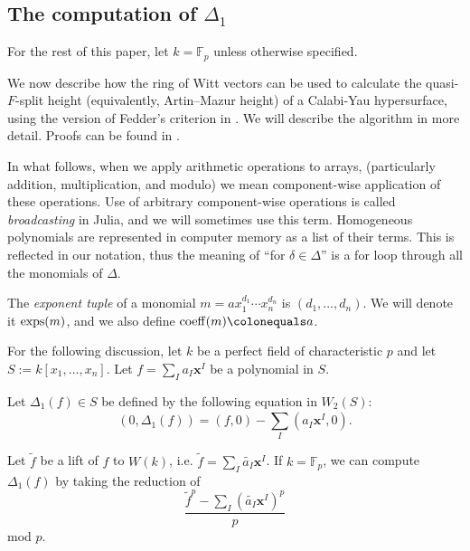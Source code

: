 \subsection{The computation of \(\Delta_{1}\)}
\label{subsec:compute:delta1}

For the rest of this paper, let \(k = \mathbb{F}_{p}\) unless otherwise specified.

We now describe how the ring of Witt vectors can be used to calculate the
quasi-\(F\)-split height (equivalently, Artin--Mazur height) of a Calabi-Yau
hypersurface, using the version of Fedder's criterion in \cite{kty-2022-fedder}.
We will describe the algorithm in more detail. Proofs can be
found in \cite{kty-2022-fedder}.

In what follows,
when we apply arithmetic operations to arrays,
(particularly addition, multiplication, and modulo)
we mean component-wise application of these operations.
Use of arbitrary component-wise operations is called
\textit{broadcasting} in Julia, and we will
sometimes use this term.
Homogeneous polynomials are represented in computer
memory as a list of their terms.
This is reflected in our notation,
thus the meaning of ``for \(\delta \in \Delta\)''
is a for loop through all the monomials
of \(\Delta\).

\begin{defn}
    \label{def:poly:nota}
    The \textit{exponent tuple} of a monomial
    $m = ax_{1}^{d_1} \cdots x_{n}^{d_n}$ is $(d_1, \dots, d_n)$.
	We will denote it $\operatorname{exps}(m)$, and we also
    define $\coeff(m) \colonequals a$.
\end{defn}

For the following discussion,
let \(k\) be a perfect field of characteristic \(p\) and
let \(S := k[x_{1}, \ldots, x_{n}]\).
Let \(f = \sum_{I}^{} a_{I}\mathbf{x}^{I}\) be a polynomial in \(S\).

\begin{defn}
    \label{defn:delta1}
	Let \(\Delta_{1}(f) \in S\)
	be defined by the following equation in \(W_{2}(S)\):
	\[
		(0, \Delta_{1}(f)) = (f,0) - \sum_{I}^{} (a_{I}\mathbf{x}^{I}, 0)
	.\]
\end{defn}


\begin{prop}
	\label{prop:delta1:formula}
	Let \(\tilde{f}\) be a lift of \(f\) to \(W(k)\),
	i.e.
	\(\tilde{f} = \sum_{I}^{} \tilde{a_{I}} \mathbf{x}^{I}\).
	If \(k = \mathbb{F}_{p}\),
	we can compute \(\Delta_{1}(f)\) by
	taking the reduction of
	\[
		\frac{\tilde{f}^{p} - \sum_{I}^{} (\tilde{a_{I}}\mathbf{x}^{I})^{p} }{p}
	\]
	mod \(p\).
\end{prop}

